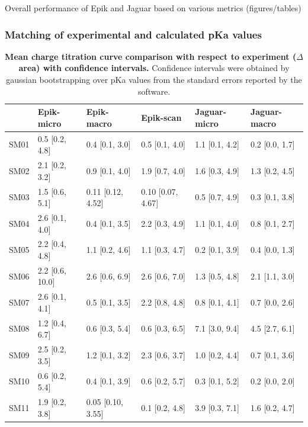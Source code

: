 \documentclass[9pt,lineno,final]{elife}
\begin{document}
Overall performance of Epik and Jaguar based on various metrics (figures/tables)
\subsubsection {Matching of experimental and calculated pKa values}




%

\begin{table}[H]
\centering
 \caption{{\bf Mean charge titration curve comparison with respect to experiment ($\Delta$ area) with confidence intervals.} Confidence intervals were obtained by gaussian bootstrapping over pKa values from the standard errors reported by the software.}\label{tab:titrationcurves}
\begin{tabular}{llllll}
\toprule
{} &       Epik-micro &         Epik-macro &          Epik-scan &    Jaguar-micro &       Jaguar-macro \\
\midrule
SM01     &   0.5 [0.2, 4.8] &     0.4 [0.1, 3.0] &     0.5 [0.1, 4.0] &  1.1 [0.1, 4.2] &     0.2 [0.0, 1.7] \\
SM02     &   2.1 [0.2, 3.2] &     0.9 [0.1, 4.0] &     1.9 [0.7, 4.0] &  1.6 [0.3, 4.9] &     1.3 [0.2, 4.5] \\
SM03     &   1.5 [0.6, 5.1] &  0.11 [0.12, 4.52] &  0.10 [0.07, 4.67] &  0.5 [0.7, 4.9] &     0.3 [0.1, 3.8] \\
SM04     &   2.6 [0.1, 4.0] &     0.4 [0.1, 3.5] &     2.2 [0.3, 4.9] &  1.1 [0.1, 4.0] &     0.8 [0.1, 2.7] \\
SM05     &   2.2 [0.4, 4.8] &     1.1 [0.2, 4.6] &     1.1 [0.3, 4.7] &  0.2 [0.1, 3.9] &     0.4 [0.0, 1.3] \\
SM06     &  2.2 [0.6, 10.0] &     2.6 [0.6, 6.9] &     2.6 [0.6, 7.0] &  1.3 [0.5, 4.8] &     2.1 [1.1, 3.0] \\
SM07     &   2.6 [0.1, 4.1] &     0.5 [0.1, 3.5] &     2.2 [0.8, 4.8] &  0.8 [0.1, 4.1] &     0.7 [0.0, 2.6] \\
SM08     &   1.2 [0.4, 6.7] &     0.6 [0.3, 5.4] &     0.6 [0.3, 6.5] &  7.1 [3.0, 9.4] &     4.5 [2.7, 6.1] \\
SM09     &   2.5 [0.2, 3.5] &     1.2 [0.1, 3.2] &     2.3 [0.6, 3.7] &  1.0 [0.2, 4.4] &     0.7 [0.1, 3.6] \\
SM10     &   0.6 [0.2, 5.4] &     0.4 [0.1, 3.9] &     0.6 [0.2, 5.7] &  0.3 [0.1, 5.2] &     0.2 [0.0, 2.0] \\
SM11     &   1.9 [0.2, 3.8] &  0.05 [0.10, 3.55] &     0.1 [0.2, 4.8] &  3.9 [0.3, 7.1] &     1.6 [0.2, 4.7] \\

\end{tabular}
\end{table}
\end{document}
